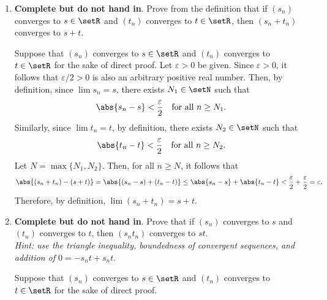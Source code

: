 \begin{enumerate}
\begin{subprove}
    \textbf{Case 2:} Suppose that \(k \neq 0\).
    Let \(\varepsilon > 0\) be given. Since \(\abs{k} > 0\), it follows that \(\tfrac{\varepsilon}{\abs{k}} > 0\) 
    is also an arbitrary positive real number.
    Then, by definition, since \(\lim s_n = s\),
    there exists \(N \in \setN\) such that
    \[
      \abs{s_n - s} < \frac{\varepsilon}{\abs{k}} \quad\text{for all } n \geq N.
    \]
    Then, for all \(n \geq N\), it follows that
    \[
      \abs{k s_n - k s} = \abs{k} \cdot \abs{s_n - s} < \abs{k} \cdot \frac{\varepsilon}{\abs{k}} = \varepsilon.
    \]
    Therefore, by definition, \(\lim (k s_n) = k s\).
    
    In both cases, it is shown that \(\lim (k s_n) = k s\).
  \end{subprove}
  \item \textbf{Complete but do not hand in}. Prove from the 
  definition that if \((s_n)\) converges to \(s \in \setR\) 
  and \((t_n)\) converges to \(t \in \setR\), then 
  \((s_n + t_n)\) converges to \(s + t\).
  \begin{subprove}
    Suppose that \((s_n)\) converges to \(s \in \setR\) and \((t_n)\) converges to \(t \in \setR\) 
    for the sake of direct proof.
    Let \(\varepsilon > 0\) be given. Since \(\varepsilon > 0\), it follows that \(\varepsilon / 2 > 0\) 
    is also an arbitrary positive real number.
    Then, by definition, since \(\lim s_n = s\),
    there exists \(N_1 \in \setN\) such that
    \[
      \abs{s_n - s} < \frac{\varepsilon}{2} \quad\text{for all } n \geq N_1.
    \]
    Similarly, since \(\lim t_n = t\), by definition,
    there exists \(N_2 \in \setN\) such that
    \[
      \abs{t_n - t} < \frac{\varepsilon}{2} \quad\text{for all } n \geq N_2.
    \]
    Let \(N = \max\{N_1, N_2\}\). Then, for all \(n \geq N\), it follows that
    \[
      \abs{(s_n + t_n) - (s + t)} = \abs{(s_n - s) + (t_n - t)} \leq \abs{s_n - s} + \abs{t_n - t} < \frac{\varepsilon}{2} + \frac{\varepsilon}{2} = \varepsilon.
    \]
    Therefore, by definition, \(\lim (s_n + t_n) = s + t\).
  \end{subprove}

  \newpage 
  
  \item \textbf{Complete but do not hand in}. Prove that if 
  \((s_n)\) converges to \(s\) and \((t_n)\) converges to 
  \(t\), then \((s_n t_n)\) converges to \(s t\). \\
  \textit{Hint: use the triangle inequality, 
  boundedness of convergent sequences, and addition of \(0 = -s_n t + s_n t\)}.
  \begin{subprove}
    Suppose that \((s_n)\) converges to \(s \in \setR\) and \((t_n)\) converges to \(t \in \setR\) 
    for the sake of direct proof.
    

\end{subprove}
\end{enumerate}
